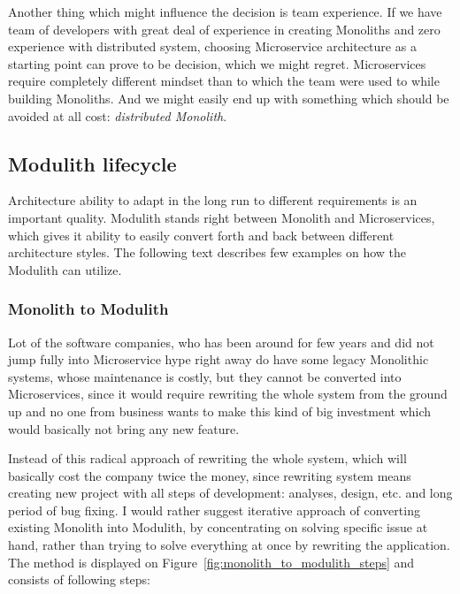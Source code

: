 Another thing which might influence the decision is team experience. If we have team of developers with great deal of experience in creating Monoliths and zero experience with distributed system, choosing Microservice architecture as a starting point can prove to be decision, which we might regret. Microservices require completely different mindset than to which the team were used to while building Monoliths. And we might easily end up with something which should be avoided at all cost: \textit{distributed Monolith}.

\subsection{Modulith lifecycle}
Architecture ability to adapt in the long run to different requirements is an important quality. Modulith stands right between Monolith and Microservices, which gives it ability to easily convert forth and back between different architecture styles. The following text describes few examples on how the Modulith can utilize.

\subsubsection{Monolith to Modulith}
\label{subsection:monolith_to_modulith}
Lot of the software companies, who has been around for few years and did not jump fully into Microservice hype right away do have some legacy Monolithic systems, whose maintenance is costly, but they cannot be converted into Microservices, since it would require rewriting the whole system from the ground up and no one from business wants to make this kind of big investment which would basically not bring any new feature.

Instead of this radical approach of rewriting the whole system, which will basically cost the company twice the money, since rewriting system means creating new project with all steps of development: analyses, design, etc. and long period of bug fixing. I would rather suggest iterative approach of converting existing Monolith into Modulith, by concentrating on solving specific issue at hand, rather than trying to solve everything at once by rewriting the application. The method is displayed on Figure~\ref{fig:monolith_to_modulith_steps} and consists of following steps:

